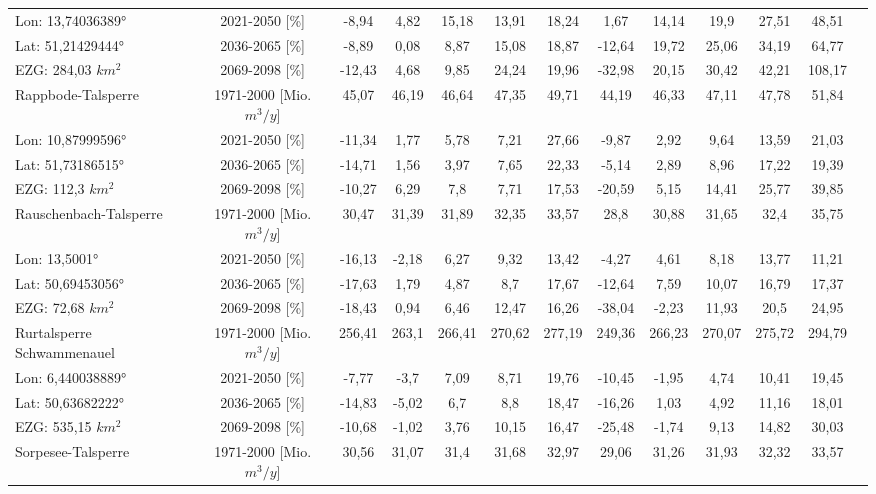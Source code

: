 \begin{longtable}{@{\extracolsep{\fill}}lc|ccccc||cccccc}
\cline{2-13} 
Lon: 13,74036389° & 2021-2050 [\%]  & -8,94 & 4,82 & 15,18 & 13,91 & 18,24 & 1,67 & 14,14 & 19,9 & 27,51 & 48,51 & \\ 
Lat: 51,21429444° & 2036-2065 [\%]  & -8,89 & 0,08 & 8,87 & 15,08 & 18,87 & -12,64 & 19,72 & 25,06 & 34,19 & 64,77 & \\ 
EZG: 284,03 $km^2$ & 2069-2098 [\%]  & -12,43 & 4,68 & 9,85 & 24,24 & 19,96 & -32,98 & 20,15 & 30,42 & 42,21 & 108,17 & \\ 
\hline 
Rappbode-Talsperre & 1971-2000 [Mio. $m^3/y$]  & 45,07 & 46,19 & 46,64 & 47,35 & 49,71 & 44,19 & 46,33 & 47,11 & 47,78 & 51,84 & \\ 
\cline{2-13} 
Lon: 10,87999596° & 2021-2050 [\%]  & -11,34 & 1,77 & 5,78 & 7,21 & 27,66 & -9,87 & 2,92 & 9,64 & 13,59 & 21,03 & \\ 
Lat: 51,73186515° & 2036-2065 [\%]  & -14,71 & 1,56 & 3,97 & 7,65 & 22,33 & -5,14 & 2,89 & 8,96 & 17,22 & 19,39 & \\ 
EZG: 112,3 $km^2$ & 2069-2098 [\%]  & -10,27 & 6,29 & 7,8 & 7,71 & 17,53 & -20,59 & 5,15 & 14,41 & 25,77 & 39,85 & \\ 
\hline 
Rauschenbach-Talsperre & 1971-2000 [Mio. $m^3/y$]  & 30,47 & 31,39 & 31,89 & 32,35 & 33,57 & 28,8 & 30,88 & 31,65 & 32,4 & 35,75 & \\ 
\cline{2-13} 
Lon: 13,5001° & 2021-2050 [\%]  & -16,13 & -2,18 & 6,27 & 9,32 & 13,42 & -4,27 & 4,61 & 8,18 & 13,77 & 11,21 & \\ 
Lat: 50,69453056° & 2036-2065 [\%]  & -17,63 & 1,79 & 4,87 & 8,7 & 17,67 & -12,64 & 7,59 & 10,07 & 16,79 & 17,37 & \\ 
EZG: 72,68 $km^2$ & 2069-2098 [\%]  & -18,43 & 0,94 & 6,46 & 12,47 & 16,26 & -38,04 & -2,23 & 11,93 & 20,5 & 24,95 & \\ 
\hline 
Rurtalsperre Schwammenauel & 1971-2000 [Mio. $m^3/y$]  & 256,41 & 263,1 & 266,41 & 270,62 & 277,19 & 249,36 & 266,23 & 270,07 & 275,72 & 294,79 & \\ 
\cline{2-13} 
Lon: 6,440038889° & 2021-2050 [\%]  & -7,77 & -3,7 & 7,09 & 8,71 & 19,76 & -10,45 & -1,95 & 4,74 & 10,41 & 19,45 & \\ 
Lat: 50,63682222° & 2036-2065 [\%]  & -14,83 & -5,02 & 6,7 & 8,8 & 18,47 & -16,26 & 1,03 & 4,92 & 11,16 & 18,01 & \\ 
EZG: 535,15 $km^2$ & 2069-2098 [\%]  & -10,68 & -1,02 & 3,76 & 10,15 & 16,47 & -25,48 & -1,74 & 9,13 & 14,82 & 30,03 & \\ 
\hline 
Sorpesee-Talsperre & 1971-2000 [Mio. $m^3/y$]  & 30,56 & 31,07 & 31,4 & 31,68 & 32,97 & 29,06 & 31,26 & 31,93 & 32,32 & 33,57 & \\ 

\end{longtable}
